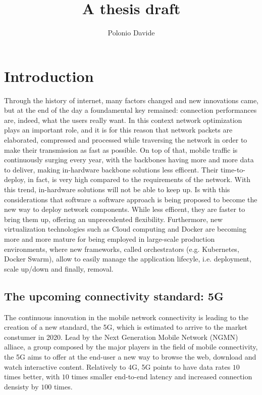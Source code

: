 \documentclass[10pt]{book}
\author{Polonio Davide} \title{A thesis draft}
\begin{document}
 \maketitle
 

 
\chapter{Introduction}
\label{chap:intro}

 Through the history of internet, many factors changed and new innovations came,
 but at the end of the day a foundamental key remained: connection performances
 are, indeed, what the users really want. In this context network optimization plays an
 important role, and it is for this reason that network packets are elaborated,
 compressed and processed while traversing the network in order to make their
 transmission as fast as possible. On top of that, mobile traffic is
 continuously surging every year, with the backbones having more and more data
 to deliver, making in-hardware backbone solutions less efficent. Their
 time-to-deploy, in fact, is very high compared to the requirements of the
 network. With this trend, in-hardware solutions will not be able to keep up. Is
 with this considerations that software a software approach is being proposed to
 become the new way to deploy network components. While less efficent, they are
 faster to bring them up, offering an unprecedented flexibility.
 Furthermore, new virtualization technologies such as Cloud computing and Docker
 are becoming more and more mature for being employed in large-scale production
 environments, where new frameworks, called orchestrators (e.g. Kubernetes,
 Docker Swarm), allow to easily manage the application lifecyle, i.e.
 deployment, scale up/down and finally, removal.

\section{The upcoming connectivity standard: 5G}
The continuous innovation in the mobile network connectivity is leading to the
creation of a new standard, the 5G, which is estimated to arrive to the market
constumer in 2020. Lead by the Next Generation Mobile Network (NGMN)
alliace, a group composed by the major players in the field of mobile
connectivity, the 5G aims to offer at the end-user a new way to browse the web,
download and watch interactive content. Relatively to 4G, 5G points to have data
rates $10$ times better, with $10$ times smaller end-to-end latency and
increased connection densisty by $100$ times.
\end{document}
